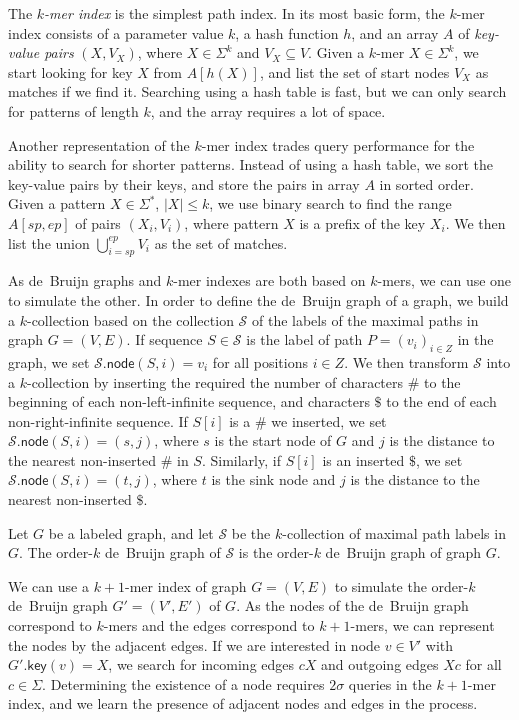 \documentclass[a4paper,UKenglish]{lipics-v2016}
\newcommand{\abs}[1]{\ensuremath{\lvert #1 \rvert}}
\newcommand{\gkey}{\ensuremath{\mathsf{key}}}
\newcommand{\gnode}{\ensuremath{\mathsf{node}}}
\newcommand{\kmer}[1]{$#1$\nobreakdash-mer}
\newcommand{\kcollection}[1]{$#1$\nobreakdash-collection}
\newcommand{\orderk}[1]{order\nobreakdash-$#1$}
\begin{document}
The \emph{\kmer{k} index} is the simplest path index. In its most basic form, the \kmer{k} index consists of a parameter value $k$, a hash function $h$, and an array $A$ of \emph{key-value pairs} $(X, V_{X})$, where $X \in \Sigma^{k}$ and $V_{X} \subseteq V$. Given a \kmer{k} $X \in \Sigma^{k}$, we start looking for key $X$ from $A[h(X)]$, and list the set of start nodes $V_{X}$ as matches if we find it. Searching using a hash table is fast, but we can only search for patterns of length $k$, and the array requires a lot of space.

Another representation of the \kmer{k} index trades query performance for the ability to search for shorter patterns. Instead of using a hash table, we sort the key-value pairs by their keys, and store the pairs in array $A$ in sorted order. Given a pattern $X \in \Sigma^{\ast}$, $\abs{X} \le k$, we use binary search to find the range $A[sp, ep]$ of pairs $(X_{i}, V_{i})$, where pattern $X$ is a prefix of the key $X_{i}$. We then list the union $\bigcup_{i=sp}^{ep} V_{i}$ as the set of matches.

As de~Bruijn graphs and \kmer{k} indexes are both based on \kmer{k}s, we can use one to simulate the other. In order to define the de~Bruijn graph of a graph, we build a \kcollection{k} based on the collection $\mathcal{S}$ of the labels of the maximal paths in graph $G = (V, E)$. If sequence $S \in \mathcal{S}$ is the label of path $P = (v_{i})_{i \in Z}$ in the graph, we set $\mathcal{S}.\gnode(S, i) = v_{i}$ for all positions $i \in Z$. We then transform $\mathcal{S}$ into a \kcollection{k} by inserting the required the number of characters $\#$ to the beginning of each non-left-infinite sequence, and characters $\$$ to the end of each non-right-infinite sequence. If $S[i]$ is a $\#$ we inserted, we set $\mathcal{S}.\gnode(S, i) = (s, j)$, where $s$ is the start node of $G$ and $j$ is the distance to the nearest non-inserted $\#$ in $S$. Similarly, if $S[i]$ is an inserted $\$$, we set $\mathcal{S}.\gnode(S, i) = (t, j)$, where $t$ is the sink node and $j$ is the distance to the nearest non-inserted $\$$.

\begin{definition}
Let $G$ be a labeled graph, and let $\mathcal{S}$ be the \kcollection{k} of maximal path labels in $G$. The \orderk{k} de~Bruijn graph of $\mathcal{S}$ is the \orderk{k} de~Bruijn graph of graph $G$.
\end{definition}

We can use a \kmer{k+1} index of graph $G = (V, E)$ to simulate the \orderk{k} de~Bruijn graph $G' = (V', E')$ of $G$. As the nodes of the de~Bruijn graph correspond to \kmer{k}s and the edges correspond to \kmer{k+1}s, we can represent the nodes by the adjacent edges. If we are interested in node $v \in V'$ with $G'.\gkey(v) = X$, we search for incoming edges $cX$ and outgoing edges $Xc$ for all $c \in \Sigma$. Determining the existence of a node requires $2 \sigma$ queries in the \kmer{k+1} index, and we learn the presence of adjacent nodes and edges in the process.
\end{document}
